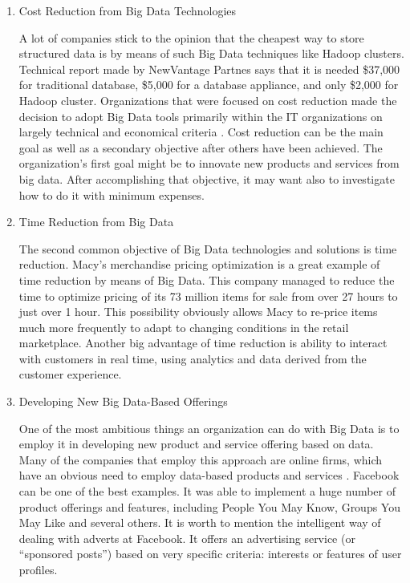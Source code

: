 \documentclass[runningheads]{llncs}
\begin{document}
\begin{enumerate}
\item Cost Reduction from Big Data Technologies

A lot of companies stick to the opinion that the cheapest way to store structured data is by means of such Big Data techniques like Hadoop clusters. Technical report \cite{NEWVANTAGE} made by NewVantage Partnes says that it is needed \$37,000 for traditional database, \$5,000 for a database appliance, and only \$2,000 for Hadoop cluster. Organizations that were focused on cost reduction made the decision to adopt Big Data tools primarily within the IT organizations on largely technical and economical criteria \cite{DAVENPORT}. Cost reduction can be the main goal as well as a secondary objective after others have been achieved. The organization's first goal might be to innovate new products and services from big data. After accomplishing that objective, it may want also to investigate how to do it with minimum expenses.

\item Time Reduction from Big Data

The second common objective of Big Data technologies and solutions is time reduction. Macy's merchandise pricing optimization is a great example of time reduction by means of Big Data. This company managed to reduce the time to optimize pricing of its 73 million items for sale from over 27 hours to just over 1 hour. This possibility obviously allows Macy to re-price items much more frequently to adapt to changing conditions in the retail marketplace\cite{DAVENPORT}. Another big advantage of time reduction is ability to interact with customers in real time, using analytics and data derived from the customer experience.  

\item Developing New Big Data-Based Offerings

One of the most ambitious things an organization can do with Big Data is to employ it in developing new product and service offering based on data. Many of the companies that employ this approach are online firms, which have an obvious need to employ data-based products and services \cite{DAVENPORT}. Facebook can be one of the best examples. It was able to implement a huge number of product offerings and features, including People You May Know, Groups You May Like and several others. It is worth to mention the intelligent way of dealing with adverts at Facebook. It offers an advertising service (or “sponsored posts”) based on very specific criteria: interests or features of user profiles. 


\end{enumerate}
\end{document}
